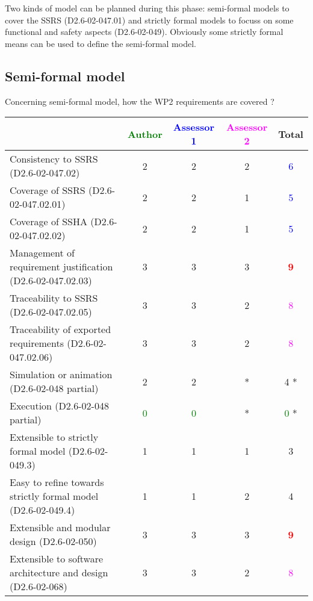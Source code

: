 Two kinds of model can be planned during this phase: semi-formal models to cover the SSRS (D2.6-02-047.01) and strictly formal models to focuss on some functional and safety aspects (D2.6-02-049). Obviously some strictly formal means can be used to define the semi-formal model.

\subsection{Semi-formal model}

Concerning semi-formal model, how the WP2 requirements are covered ?

\begin{tabular}{|l | c | c | c | c|}
\hline
& \textcolor{green}{Author} & \textcolor{blue}{Assessor 1} & \textcolor{magenta}{Assessor 2} & Total \\
\hline
Consistency to SSRS (D2.6-02-047.02) & 2    & 2    & 2    & \textcolor{blue}{6} \\
\hline
Coverage of SSRS (D2.6-02-047.02.01) & 2    & 2    & 1    & \textcolor{blue}{5} \\
\hline
Coverage of SSHA (D2.6-02-047.02.02) & 2    & 2    & 1    & \textcolor{blue}{5} \\
\hline
Management of requirement justification (D2.6-02-047.02.03) & 3    & 3    & 3    & \textcolor{red}{\textbf{9}} \\
\hline
Traceability to SSRS (D2.6-02-047.02.05) & 3    & 3    & 2    & \textcolor{magenta}{8} \\
\hline
Traceability of exported requirements (D2.6-02-047.02.06) & 3    & 3    & 2    & \textcolor{magenta}{8} \\
\hline
Simulation or animation (D2.6-02-048 partial) & 2    & 2    &  * & 4   * \\
\hline
Execution (D2.6-02-048 partial) & \textcolor{green}{0} & \textcolor{green}{0} & * & \textcolor{green}{0} * \\
\hline
Extensible to strictly formal model (D2.6-02-049.3) & 1    & 1    & 1    & 3    \\
\hline
Easy to refine towards strictly formal model (D2.6-02-049.4) & 1    & 1    & 2    & 4    \\
\hline
Extensible and modular design (D2.6-02-050) & 3    & 3    & 3    & \textcolor{red}{\textbf{9}} \\
\hline
Extensible to software architecture and design (D2.6-02-068) & 3    & 3    & 2    & \textcolor{magenta}{8} \\
\hline
\end{tabular}



